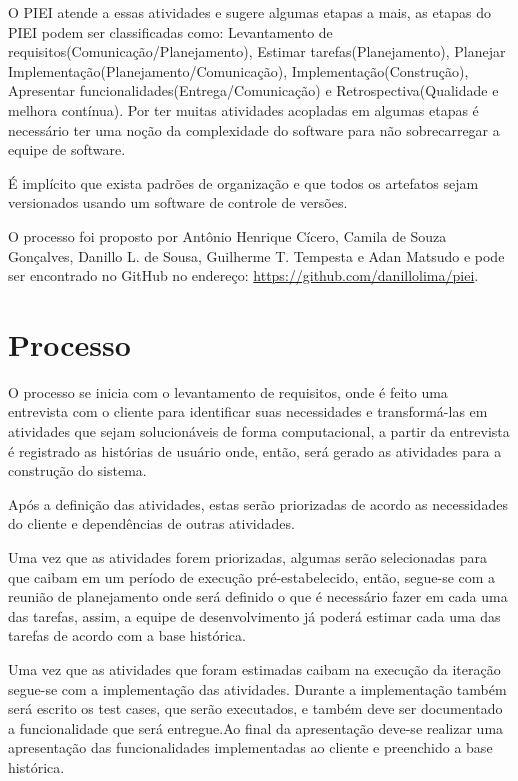 \documentclass[	DIV=calc,%
							paper=a4,%
							fontsize=12pt,%
							onecolumn]{scrartcl}	 					%
\begin{document}
O PIEI atende a essas atividades e sugere algumas etapas a mais, as etapas do PIEI podem ser classificadas como: Levantamento de requisitos(Comunicação/Planejamento), Estimar tarefas(Planejamento), Planejar Implementação(Planejamento/Comunicação), Implementação(Construção), Apresentar funcionalidades(Entrega/Comunicação) e Retrospectiva(Qualidade e melhora contínua). Por ter muitas atividades acopladas em algumas etapas é necessário ter uma noção da complexidade do  software para não sobrecarregar a equipe de software.

É implícito que exista padrões de organização e que todos os artefatos sejam versionados usando um software de controle de versões.

O processo foi proposto por Antônio Henrique Cícero, Camila de Souza Gonçalves, Danillo L. de Sousa, Guilherme T. Tempesta e Adan Matsudo e pode ser encontrado no GitHub no endereço:  \href{https://github.com/danillolima/piei}{https://github.com/danillolima/piei}.

\section{Processo}
O processo se inicia com o levantamento de requisitos, onde é feito uma entrevista com o cliente para identificar suas necessidades e transformá-las em atividades que sejam solucionáveis de forma computacional, a partir da entrevista é registrado as histórias de usuário onde, então, será gerado as atividades para a construção do sistema. 

Após a definição das atividades, estas serão priorizadas de acordo as necessidades do cliente e dependências de outras atividades. 

Uma vez que as atividades forem priorizadas, algumas serão selecionadas para que caibam em um período de execução pré-estabelecido, então, segue-se com a reunião de planejamento onde será definido o que é necessário fazer em cada uma das tarefas, assim, a equipe de desenvolvimento já poderá estimar cada uma das tarefas de acordo com a base histórica.

Uma vez que as atividades que foram estimadas caibam na execução da iteração segue-se com a implementação das atividades. Durante a implementação também será escrito os test cases, que serão executados, e também deve ser documentado a funcionalidade que será entregue.Ao final da apresentação deve-se realizar uma apresentação das funcionalidades implementadas ao cliente e preenchido a base histórica. 
\end{document}

